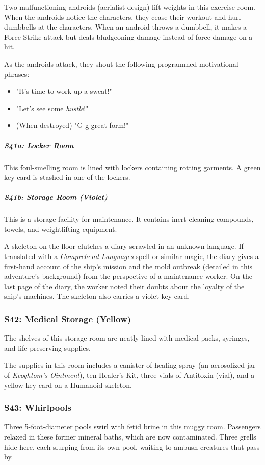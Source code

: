 \documentclass[10pt,a4paper,twoside,bg=print,twocolumn,openany,nodeprecatedcode]{dndbook}
\begin{document}
Two malfunctioning androids (aerialist design) lift weights in this exercise room. When the androids notice the characters, they cease their workout and hurl dumbbells at the characters. When an android throws a dumbbell, it makes a Force Strike attack but deals bludgeoning damage instead of force damage on a hit.

As the androids attack, they shout the following programmed motivational phrases:


\begin{itemize}
\item "It's time to work up a sweat!"
\item "Let's see some \textit{hustle}!"
\item (When destroyed) "G-g-great form!"
\end{itemize}

\subparagraph{S41a: Locker Room}
This foul-smelling room is lined with lockers containing rotting garments. A green key card is stashed in one of the lockers.

\subparagraph{S41b: Storage Room (Violet)}
This is a storage facility for maintenance. It contains inert cleaning compounds, towels, and weightlifting equipment.

A skeleton on the floor clutches a diary scrawled in an unknown language. If translated with a \textit{Comprehend Languages} spell or similar magic, the diary gives a first-hand account of the ship's mission and the mold outbreak (detailed in this adventure's background) from the perspective of a maintenance worker. On the last page of the diary, the worker noted their doubts about the loyalty of the ship's machines. The skeleton also carries a violet key card.

\subsubsection{S42: Medical Storage (Yellow)}
\begin{DndReadAloud}{}
The shelves of this storage room are neatly lined with medical packs, syringes, and life-preserving supplies.

\end{DndReadAloud}

The supplies in this room includes a canister of healing spray (an aerosolized jar of \textit{Keoghtom's Ointment}), ten Healer's Kit, three vials of Antitoxin (vial), and a yellow key card on a Humanoid skeleton.

\subsubsection{S43: Whirlpools}
Three 5-foot-diameter pools swirl with fetid brine in this muggy room. Passengers relaxed in these former mineral baths, which are now contaminated. Three grells hide here, each slurping from its own pool, waiting to ambush creatures that pass by.
\end{document}
